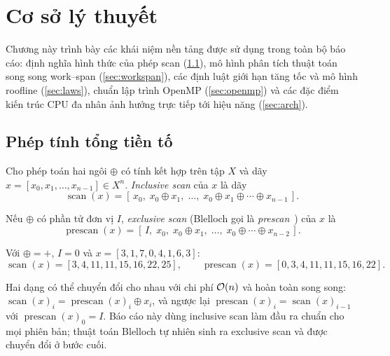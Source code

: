 \chapter{Cơ sở lý thuyết}
\label{ch:background}

Chương này trình bày các khái niệm nền tảng được sử dụng trong toàn bộ báo cáo: định nghĩa
hình thức của phép scan (\cref{sec:scan-def}), mô hình phân tích thuật toán song song
work--span (\cref{sec:workspan}), các định luật giới hạn tăng tốc và mô hình roofline
(\cref{sec:laws}), chuẩn lập trình OpenMP (\cref{sec:openmp}) và các đặc điểm kiến trúc CPU đa
nhân ảnh hưởng trực tiếp tới hiệu năng (\cref{sec:arch}).

\section{Phép tính tổng tiền tố}
\label{sec:scan-def}

\begin{definition}
Cho phép toán hai ngôi \(\oplus\) có tính kết hợp trên tập \(X\) và dãy
\(x = [x_0, x_1, \ldots, x_{n-1}] \in X^n\). \emph{Inclusive scan} của \(x\) là dãy
\[
  \operatorname{scan}(x) = [\,x_0,\; x_0 \oplus x_1,\; \ldots,\; x_0 \oplus x_1 \oplus \cdots \oplus x_{n-1}\,].
\]
\end{definition}

\begin{definition}
Nếu \(\oplus\) có phần tử đơn vị \(I\), \emph{exclusive scan} (Blelloch gọi là
\emph{prescan}~\cite{blelloch1990}) của \(x\) là
\[
  \operatorname{prescan}(x) = [\,I,\; x_0,\; x_0 \oplus x_1,\; \ldots,\; x_0 \oplus \cdots \oplus x_{n-2}\,].
\]
\end{definition}

\begin{example}
Với \(\oplus = +\), \(I = 0\) và \(x = [3, 1, 7, 0, 4, 1, 6, 3]\):
\[
  \operatorname{scan}(x) = [3, 4, 11, 11, 15, 16, 22, 25], \qquad
  \operatorname{prescan}(x) = [0, 3, 4, 11, 11, 15, 16, 22].
\]
\end{example}

Hai dạng có thể chuyển đổi cho nhau với chi phí \(\mathcal{O}(n)\) và hoàn toàn song song:
\(\operatorname{scan}(x)_i = \operatorname{prescan}(x)_i \oplus x_i\), và ngược lại
\(\operatorname{prescan}(x)_i = \operatorname{scan}(x)_{i-1}\) với \(\operatorname{prescan}(x)_0 = I\).
Báo cáo này dùng inclusive scan làm đầu ra chuẩn cho mọi phiên bản; thuật toán Blelloch tự
nhiên sinh ra exclusive scan và được chuyển đổi ở bước cuối.

